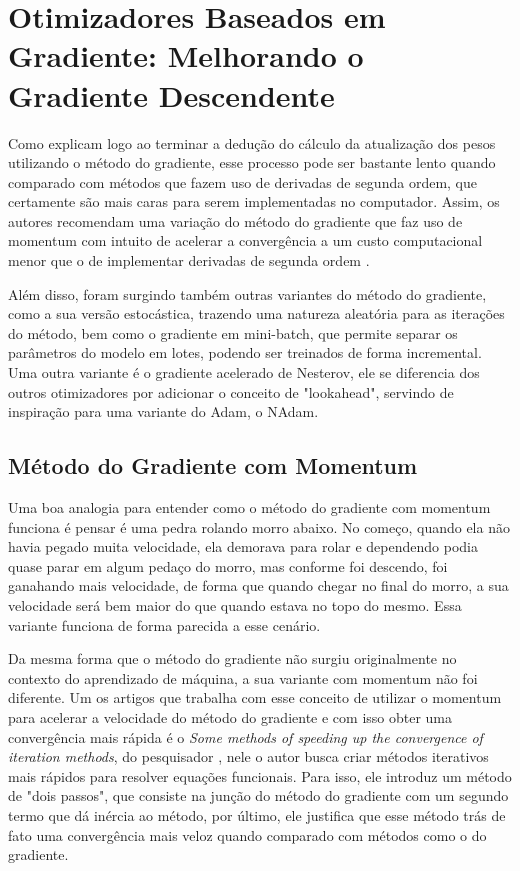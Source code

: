 \section{Otimizadores Baseados em Gradiente: Melhorando o Gradiente Descendente}

Como \textcite{BackpropagationArticle} explicam logo ao terminar a dedução do cálculo da atualização dos pesos utilizando o método do gradiente, esse processo pode ser bastante lento quando comparado com métodos que fazem uso de derivadas de segunda ordem, que certamente são mais caras para serem implementadas no computador. Assim, os autores recomendam uma variação do método do gradiente que faz uso de momentum com intuito de acelerar a convergência a um custo computacional menor que o de implementar derivadas de segunda ordem \parencite{BackpropagationArticle}.

Além disso, foram surgindo também outras variantes do método do gradiente, como a sua versão estocástica, trazendo uma natureza aleatória para as iterações do método, bem como o gradiente em mini-batch, que permite separar os parâmetros do modelo em lotes, podendo ser treinados de forma incremental. Uma outra variante é o gradiente acelerado de Nesterov, ele se diferencia dos outros otimizadores por adicionar o conceito de "lookahead", servindo de inspiração para uma variante do Adam, o NAdam.

\subsection{Método do Gradiente com Momentum}

Uma boa analogia para entender como o método do gradiente com momentum funciona é pensar é uma pedra rolando morro abaixo. No começo, quando ela não havia pegado muita velocidade, ela demorava para rolar e dependendo podia quase parar em algum pedaço do morro, mas conforme foi descendo, foi ganahando mais velocidade, de forma que quando chegar no final do morro, a sua velocidade será bem maior do que quando estava no topo do mesmo. Essa variante funciona de forma parecida a esse cenário.

Da mesma forma que o método do gradiente não surgiu originalmente no contexto do aprendizado de máquina, a sua variante com momentum não foi diferente. Um os artigos que trabalha com esse conceito de utilizar o momentum para acelerar a velocidade do método do gradiente e com isso obter uma convergência mais rápida é o \textit{Some methods of speeding up the convergence of iteration methods}, do pesquisador \textcite{polyak1964}, nele o autor busca criar métodos iterativos mais rápidos para resolver equações funcionais. Para isso, ele introduz um método de "dois passos", que consiste na junção do método do gradiente com um segundo termo que dá inércia ao método, por último, ele justifica que esse método trás de fato uma convergência mais veloz quando comparado com métodos como o do gradiente.

